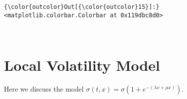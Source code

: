 \documentclass[11pt]{article}
\begin{document}
            \begin{Verbatim}[commandchars=\\\{\}]
{\color{outcolor}Out[{\color{outcolor}15}]:} <matplotlib.colorbar.Colorbar at 0x119dbc8d0>
\end{Verbatim}
        
    \begin{center}
    \end{center}
    { \hspace*{\fill} \\}
    
    \section{Local Volatility Model}\label{local-volatility-model}

Here we discuss the model
\(\sigma(t,x) = \sigma (1 + e^{-(\lambda x + \mu x)})\).
\end{document}
